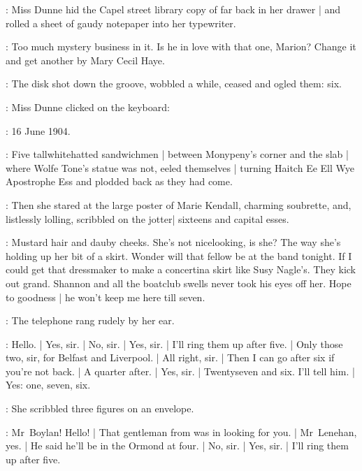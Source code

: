 :
Miss Dunne hid the Capel street library copy
of  far back in her drawer |
and rolled a sheet of gaudy notepaper into her typewriter.%

\dunneint:
Too much mystery business in it.
Is he in love with that one, Marion?
Change it and get another by Mary Cecil Haye.
 
\begin{interject}
    :
    The disk shot down the groove,
    wobbled a while,
    ceased and ogled them: six.
\end{interject}

:
Miss Dunne clicked on the keyboard:

\missdunne:
16 June 1904.

\begin{interject}
    :
    Five tall\-white\-hatted sandwichmen |
    between Monypeny's corner and the slab |
    where Wolfe Tone's statue was not,
    eeled themselves |
    turning Haitch Ee Ell Wye Apostrophe Ess \stage{[H.E.L.Y.'S]}
    and plodded back as they had come.
\end{interject}

:
Then she stared at the large poster of Marie Kendall,%
charming soubrette,
and,
listlessly lolling,
scribbled on the jotter|
sixteens and capital esses.

\dunneint:
Mustard hair and dauby cheeks.
She's not nicelooking, is she?
The way she's holding up her bit of a skirt.
Wonder will that fellow be at the band tonight.
If I could get that dressmaker
to make a concertina skirt like Susy Nagle's.
They kick out grand.
Shannon and all the boatclub swells never took his eyes off her.
Hope to goodness |
he won't keep me here till seven.

:
The telephone rang rudely by her ear.

\missdunne:
Hello. |
Yes, sir. |
No, sir. |
Yes, sir. |
I'll ring them up after five. |
Only those two, sir, for Belfast and Liverpool. |
All right, sir. |
Then I can go after six if you're not back. |
A quarter after. |
Yes, sir. |
Twentyseven and six.
I'll tell him. |
Yes: one, seven, six.

:
She scribbled three figures on an envelope.

\missdunne:
Mr~Boylan!
Hello! |
That gentleman from  was in looking for you. |
Mr~Lenehan, yes. |
He said he'll be in the Ormond at four. |
No, sir. |
Yes, sir. |
I'll ring them up after five.



